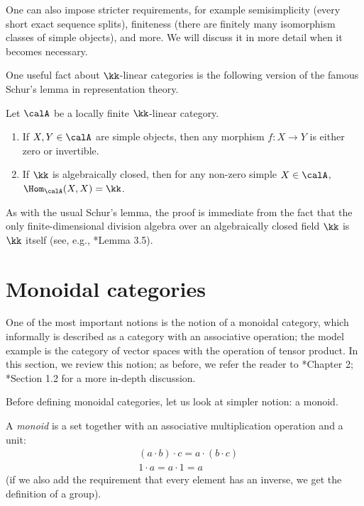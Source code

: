 One can also impose stricter requirements, for example semisimplicity (every
short exact sequence splits), finiteness (there are finitely many isomorphism
classes of simple objects), and more. We will discuss it in more detail when it
becomes necessary.

One useful fact about $\kk$-linear categories is the following version of the
famous Schur's lemma in representation theory.

\begin{lemma}\label{l:schur}
  Let $\calA$ be a locally finite $\kk$-linear category.
  \begin{enumerate}
    \item If $X,Y\in \calA$ are simple objects, then any morphism
      $f\colon X\to Y$ is either zero or invertible.
    \item If $\kk$ is algebraically closed, then for any non-zero
      simple $X\in \calA$, $\Hom_\calA(X,X)=\kk$.
  \end{enumerate}
\end{lemma}
As with the usual Schur's lemma, the proof is immediate from the fact that the
only  finite-dimensional division algebra over an algebraically closed field
$\kk$ is $\kk$ itself (see, e.g., *{Lemma 3.5}).

\section{Monoidal categories}\label{s:monoidal}
One of the most important notions is the notion of a monoidal category, which
informally is described as a category with an associative operation; the model
example is the category of vector spaces with the operation of tensor product.
In this section, we review this notion; as before, we refer the reader to
*{Chapter 2}; *{Section 1.2} for a more
in-depth discussion.

Before defining monoidal categories, let us look at simpler notion: a monoid.

A \emph{monoid} is a set together with an associative
multiplication operation and a unit:
\begin{align*}
  &(a\cdot b)\cdot c = a\cdot (b\cdot c)\\
  &1\cdot a = a\cdot 1 = a
\end{align*}
(if we also add the requirement that every element has an inverse,
we get the definition of a group).

